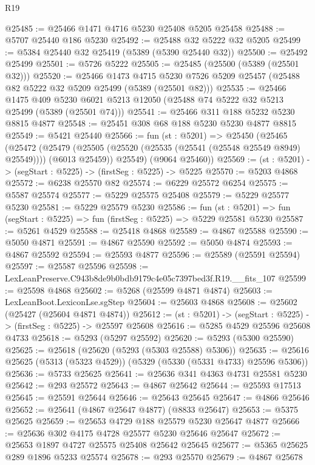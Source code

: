 \begin{lexlean}{R19}
\begin{coremodule}
@25485 := @25466 @1471 @4716 @5230 @25408 @5205 @25458
@25488 := @5707 @25440 @186 @5230
@25492 := @25488 @32 @5222 @32 @5205
@25499 := @5384 @25440 @32 @25419 (@5389 (@5390 @25440 @32))
@25500 := @25492 @25499
@25501 := @5726 @5222
@25505 := @25485 (@25500 (@5389 (@25501 @32)))
@25520 := @25466
    @1473
    @4715
    @5230
    @7526
    @5209
    @25457
    (@25488 @82 @5222 @32 @5209 @25499 (@5389 (@25501 @82)))
@25535 := @25466
    @1475
    @409
    @5230
    @6021
    @5213
    @12050
    (@25488 @74 @5222 @32 @5213 @25499 (@5389 (@25501 @74)))
@25541 := @25466 @311 @188 @5232 @5230 @8815 @4877
@25548 := @25451 @308 @68 @188 @5230 @5230 @4877 @8815
@25549 := @5421 @25440
@25566 := fun (st : @5201) =>
  @25450
    (@25465
      (@25472
        (@25479 (@25505 (@25520 (@25535 (@25541 (@25548 @25549 @8949) @25549)))) (@6013 @25459))
        @25549)
      (@9064 @25460))
@25569 := (st : @5201) -> (segStart : @5225) -> (firstSeg : @5225) -> @5225
@25570 := @5203 @4868
@25572 := @6238 @25570 @82
@25574 := @6229 @25572 @6254
@25575 := @5587 @25574
@25577 := @5229 @25575 @25408
@25579 := @5229 @25577 @5230
@25581 := @5229 @25579 @5230
@25586 := fun (st : @5201) => fun (segStart : @5225) => fun (firstSeg : @5225) => @5229 @25581 @5230
@25587 := @5261 @4529
@25588 := @25418 @4868
@25589 := @4867 @25588
@25590 := @5050 @4871
@25591 := @4867 @25590
@25592 := @5050 @4874
@25593 := @4867 @25592
@25594 := @25593 @4877
@25596 := @25589 (@25591 @25594)
@25597 := @25587 @25596
@25598 := LexLeanPreserve.C943b8de9b0bdb9179c4e05c7397bed3f.R19.__fits_107
@25599 := @25598 @4868
@25602 := @5268 (@25599 @4871 @4874)
@25603 := LexLeanBoot.LexiconLse.sgStep
@25604 := @25603 @4868
@25608 := @25602 (@25427 (@25604 @4871 @4874))
@25612 := (st : @5201) -> (segStart : @5225) -> (firstSeg : @5225) -> @25597 @25608
@25616 := @5285 @4529 @25596 @25608 @4733
@25618 := @5293 (@5297 @25592)
@25620 := @5293 (@5300 @25590)
@25625 := @25618 (@25620 (@5293 (@5303 @25588) @5306))
@25635 := @25616 @25625 (@5313 (@5323 @4529)) (@5329 (@5330 (@5331 @4733) @25596 @5306))
@25636 := @5733 @25625
@25641 := @25636 @341 @4363 @4731 @25581 @5230
@25642 := @293 @25572
@25643 := @4867 @25642
@25644 := @25593 @17513
@25645 := @25591 @25644
@25646 := @25643 @25645
@25647 := @4866 @25646
@25652 := @25641 (@4867 @25647 @4877) (@8833 @25647)
@25653 := @5375 @25625
@25659 := @25653 @4729 @188 @25579 @5230 @25647 @4877
@25666 := @25636 @302 @4175 @4728 @25577 @5230 @25646 @25647
@25672 := @25653 @1897 @4727 @25575 @25408 @25642 @25645
@25677 := @5365 @25625 @289 @1896 @5233 @25574
@25678 := @293 @25570
@25679 := @4867 @25678

\end{coremodule}
\end{lexlean}
